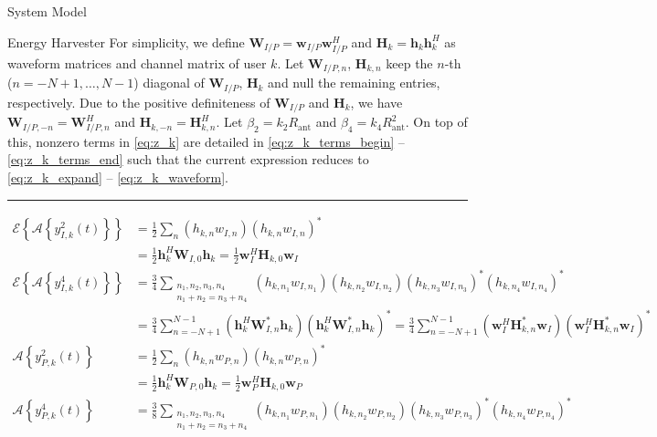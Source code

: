 \documentclass{IEEEtran}
\begin{document}
\begin{section}{System Model}
\begin{subsection}{Energy Harvester}
		For simplicity, we define $\boldsymbol{W}_{I/P}=\boldsymbol{w}_{I/P}\boldsymbol{w}_{I/P}^H$ and $\boldsymbol{H}_k=\boldsymbol{h}_k\boldsymbol{h}_k^H$ as waveform matrices and channel matrix of user $k$. Let $\boldsymbol{W}_{I/P,n}$, $\boldsymbol{H}_{k,n}$ keep the $n$-th ($n=-N+1,\dots,N-1$) diagonal of $\boldsymbol{W}_{I/P}$, $\boldsymbol{H}_k$ and null the remaining entries, respectively. Due to the positive definiteness of $\boldsymbol{W}_{I/P}$ and $\boldsymbol{H}_k$, we have $\boldsymbol{W}_{I/P,-n}=\boldsymbol{W}_{I/P,n}^H$ and $\boldsymbol{H}_{k,-n}=\boldsymbol{H}_{k,n}^H$. Let $\beta_2={k_2}{R_{\text{ant}}}$ and $\beta_4={k_4}{R_{\text{ant}}^2}$. On top of this, nonzero terms in \ref{eq:z_k} are detailed in \ref{eq:z_k_terms_begin} -- \ref{eq:z_k_terms_end} such that the current expression reduces to \ref{eq:z_k_expand} -- \ref{eq:z_k_waveform}.
		\begin{figure*}[b]
			\hrule
			\begin{align}
				\mathcal{E}\left\{\mathcal{A}\left\{y_{I,k}^2(t)\right\}\right\}
				& = \frac{1}{2}\sum_n{(h_{k,n}w_{I,n})(h_{k,n}w_{I,n})^*}\label{eq:z_k_terms_begin}\\
				& = \frac{1}{2}\boldsymbol{h}_k^H\boldsymbol{W}_{I,0}\boldsymbol{h}_k = \frac{1}{2}\boldsymbol{w}_I^H\boldsymbol{H}_{k,0}\boldsymbol{w}_I\\
				\mathcal{E}\left\{\mathcal{A}\left\{y_{I,k}^4(t)\right\}\right\}
				& = \frac{3}{4}\sum_{\substack{{n_1},{n_2},{n_3},{n_4}\\{n_1}+{n_2}={n_3}+{n_4}}}{(h_{k,{n_1}}w_{I,{n_1}})(h_{k,{n_2}}w_{I,{n_2}})(h_{k,{n_3}}w_{I,{n_3}})^*(h_{k,{n_4}}w_{I,{n_4}})^*}\\
				& = \frac{3}{4}\sum_{n=-N+1}^{N-1}(\boldsymbol{h}_k^H\boldsymbol{W}_{I,n}^*\boldsymbol{h}_k)(\boldsymbol{h}_k^H\boldsymbol{W}_{I,n}^*\boldsymbol{h}_k)^* = \frac{3}{4}\sum_{n=-N+1}^{N-1}(\boldsymbol{w}_I^H\boldsymbol{H}_{k,n}^*\boldsymbol{w}_I)(\boldsymbol{w}_I^H\boldsymbol{H}_{k,n}^*\boldsymbol{w}_I)^*\\
				\mathcal{A}\left\{y_{P,k}^2(t)\right\}
				& = \frac{1}{2}\sum_n{(h_{k,n}w_{P,n})(h_{k,n}w_{P,n})^*}\\
				& = \frac{1}{2}\boldsymbol{h}_k^H\boldsymbol{W}_{P,0}\boldsymbol{h}_k = \frac{1}{2}\boldsymbol{w}_P^H\boldsymbol{H}_{k,0}\boldsymbol{w}_P\\
				\mathcal{A}\left\{y_{P,k}^4(t)\right\}
				& = \frac{3}{8}\sum_{\substack{{n_1},{n_2},{n_3},{n_4}\\{n_1}+{n_2}={n_3}+{n_4}}}{(h_{k,{n_1}}w_{P,{n_1}})(h_{k,{n_2}}w_{P,{n_2}})(h_{k,{n_3}}w_{P,{n_3}})^*(h_{k,{n_4}}w_{P,{n_4}})^*}\\

\end{align}
\end{figure*}
\end{subsection}
\end{section}
\end{document}
